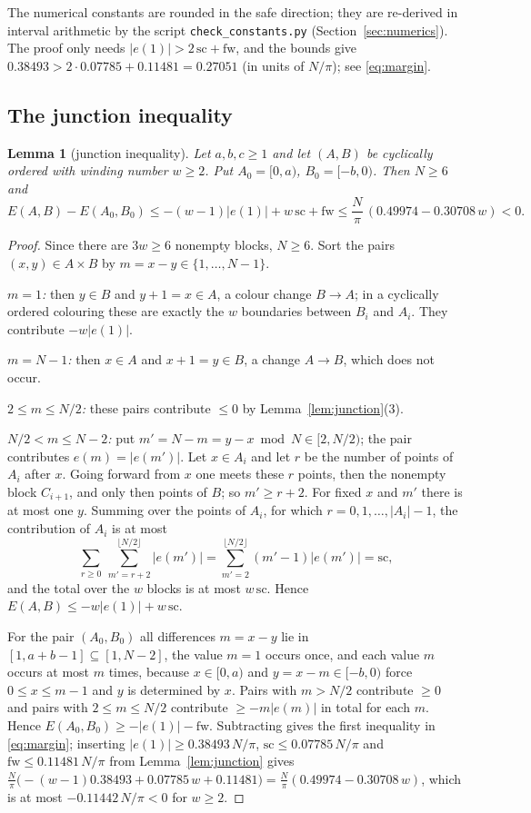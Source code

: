 \documentclass[11pt]{amsart}
\newtheorem{lemma}[theorem]{Lemma}
\theoremstyle{definition}
\theoremstyle{remark}
\newcommand{\sprod}{\mathrm{sc}}
\newcommand{\fw}{\mathrm{fw}}
\begin{document}
The numerical constants are rounded in the safe direction; they are re-derived in interval arithmetic by the
script \texttt{check\_constants.py} (Section~\ref{sec:numerics}). The proof only needs
$|e(1)|>2\,\sprod+\fw$, and the bounds give $0.38493>2\cdot0.07785+0.11481=0.27051$ (in units of $N/\pi$); see
\eqref{eq:margin}.

\subsection{The junction inequality}

\begin{lemma}[junction inequality]\label{lem:junctionineq}
Let $a,b,c\ge1$ and let $(A,B)$ be cyclically ordered with winding number $w\ge2$. Put $A_0=[0,a)$, $B_0=[-b,0)$.
Then $N\ge6$ and
\begin{equation}\label{eq:margin}
E(A,B)-E(A_0,B_0)\le-(w-1)|e(1)|+w\,\sprod+\fw\le\frac N\pi\,(0.49974-0.30708\,w)<0 .
\end{equation}
\end{lemma}

\begin{proof}
Since there are $3w\ge6$ nonempty blocks, $N\ge6$. Sort the pairs $(x,y)\in A\times B$ by $m=x-y\in\{1,\dots,N-1\}$.

\emph{$m=1$:} then $y\in B$ and $y+1=x\in A$, a colour change $B\to A$; in a cyclically ordered colouring these are
exactly the $w$ boundaries between $B_i$ and $A_i$. They contribute $-w|e(1)|$.

\emph{$m=N-1$:} then $x\in A$ and $x+1=y\in B$, a change $A\to B$, which does not occur.

\emph{$2\le m\le N/2$:} these pairs contribute $\le0$ by Lemma~\ref{lem:junction}(3).

\emph{$N/2<m\le N-2$:} put $m'=N-m=y-x\bmod N\in[2,N/2)$; the pair contributes $e(m)=|e(m')|$. Let $x\in A_i$ and let
$r$ be the number of points of $A_i$ after $x$. Going forward from $x$ one meets these $r$ points, then the nonempty
block $C_{i+1}$, and only then points of $B$; so $m'\ge r+2$. For fixed $x$ and $m'$ there is at most one $y$. Summing
over the points of $A_i$, for which $r=0,1,\dots,|A_i|-1$, the contribution of $A_i$ is at most
\[
\sum_{r\ge0}\ \sum_{m'=r+2}^{\lfloor N/2\rfloor}|e(m')|=\sum_{m'=2}^{\lfloor N/2\rfloor}(m'-1)|e(m')|=\sprod,
\]
and the total over the $w$ blocks is at most $w\,\sprod$. Hence $E(A,B)\le-w|e(1)|+w\,\sprod$.

For the pair $(A_0,B_0)$ all differences $m=x-y$ lie in $[1,a+b-1]\subseteq[1,N-2]$, the value $m=1$ occurs once,
and each value $m$ occurs at most $m$ times, because $x\in[0,a)$ and $y=x-m\in[-b,0)$ force $0\le x\le m-1$ and $y$
is determined by $x$. Pairs with $m>N/2$ contribute $\ge0$ and pairs with $2\le m\le N/2$ contribute
$\ge-m|e(m)|$ in total for each $m$. Hence $E(A_0,B_0)\ge-|e(1)|-\fw$. Subtracting gives the first inequality in \eqref{eq:margin};
inserting $|e(1)|\ge0.38493\,N/\pi$, $\sprod\le0.07785\,N/\pi$ and $\fw\le0.11481\,N/\pi$ from
Lemma~\ref{lem:junction} gives $\frac N\pi\bigl(-(w-1)0.38493+0.07785\,w+0.11481\bigr)=\frac N\pi(0.49974-0.30708\,w)$,
which is at most $-0.11442\,N/\pi<0$ for $w\ge2$.
\end{proof}
\end{document}
